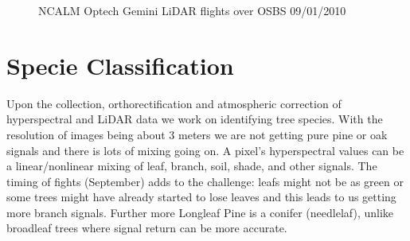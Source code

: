 \documentclass[remotesensing,article,accept,moreauthors,pdftex,12pt,a4paper]{mdpi}
\begin{document}
\begin{figure}[tp]
  \centering
  \hspace{3em}%
   \caption{NCALM Optech Gemini LiDAR flights over OSBS 09/01/2010 \cite{neon2010aopdatarelease}}
 \label{fig:lidar}
\end{figure}



\section{Specie Classification}

Upon the collection, orthorectification and atmospheric correction of hyperspectral and LiDAR data we work on identifying tree species. With the resolution of images being about 3 meters we are not getting pure pine or oak signals and there is lots of mixing going on. A pixel's hyperspectral values can be a linear/nonlinear mixing of leaf, branch, soil, shade, and other signals. The timing of fights (September) adds to the challenge: leafs might not be as green or some trees might have already started to lose leaves and this leads to us getting more branch signals. Further more Longleaf Pine is a conifer (needlelaf), unlike broadleaf trees where signal return can be more accurate. 
\end{document}
